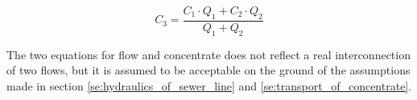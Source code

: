 \begin{equation}\label{poop_addition_interconnection}
	\boxed{C_3 = \frac{C_1 \cdot Q_1 + C_2 \cdot Q_2}{Q_1 + Q_2}}
\end{equation}

The two equations for flow and concentrate does not reflect a real interconnection of two flows, but it is assumed to be acceptable on the ground of the assumptions made in section \ref{se:hydraulics_of_sewer_line} and \ref{se:transport_of_concentrate}. 



